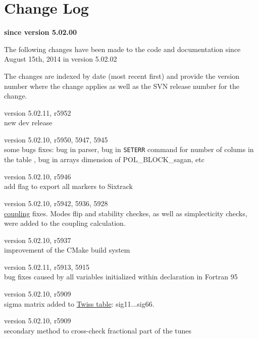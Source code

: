 \chapter*{Change Log}
\label{chap:changelog}

\begin{center} 
\textbf{since version 5.02.00}
\end{center}

The following changes have been made to the code and documentation since
August 15th, 2014 in version 5.02.02

The changes are indexed by date (most recent first) and provide the \madx 
version number where the change applies as well as the SVN 
release number for the change. 

\begin{madlist}
   version 5.02.11, r5952\\
  new dev release

   version 5.02.10, r5950, 5947, 5945\\
    some bugs fixes: bug in parser, bug in \texttt{SETERR} command for number of colums in the table , bug in arrays dimension of POL\_BLOCK\_sagan, etc 

   version 5.02.10, r5946\\
   add flag to export all markers to Sixtrack

   version 5.02.10, r5942, 5936, 5928 \\
    \hyperref[sec:coupling]{coupling} fixes. Modes flip and stability checkes, as well as simplecticity checks, were added to the coupling calculation.  
  
   version 5.02.10, r5937 \\
    improvement of the CMake build system 
  
  version 5.02.11, r5913, 5915\\
    bug fixes caused by all variables initialized within declaration in Fortran 95 

   version 5.02.10, r5909 \\
   sigma matrix added to \hyperref[chap:twiss]{Twiss table}:  sig11...sig66. 

   version 5.02.10, r5909 \\ 
    secondary method to cross-check fractional part of the tunes 
  

\end{madlist}
